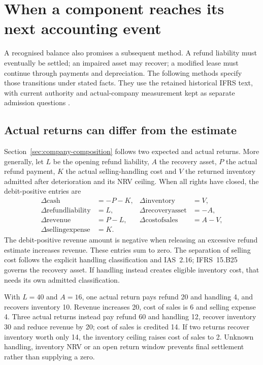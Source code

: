 \section{When a component reaches its next accounting event}
\label{sec:corporate-residuals}

A recognised balance also promises a subsequent method. A refund liability
must eventually be settled; an impaired asset may recover; a modified lease
must continue through payments and depreciation. The following methods specify
those transitions under stated facts. They use the retained historical
IFRS text, with current authority and actual-company measurement kept as
separate admission questions \citep{eu20231803}.

\subsection{Actual returns can differ from the estimate}

Section~\ref{sec:company-composition} follows two expected and actual returns.
More generally, let \(L\) be the opening refund liability, \(A\) the recovery
asset, \(P\) the actual refund payment, \(K\) the actual selling-handling cost
and \(V\) the returned inventory admitted after deterioration and its NRV
ceiling. When all rights have closed, the debit-positive entries are
\begin{align}
 \Delta\mathrm{cash}&=-P-K,&
 \Delta\mathrm{inventory}&=V,\\
 \Delta\mathrm{refund liability}&=L,&
 \Delta\mathrm{recovery asset}&=-A,\\
 \Delta\mathrm{revenue}&=P-L,&
 \Delta\mathrm{cost of sales}&=A-V,\\
 \Delta\mathrm{selling expense}&=K.
\end{align}
The debit-positive revenue amount is negative when releasing an excessive
refund estimate increases revenue. These entries sum to zero. The separation
of selling cost follows the explicit handling classification and IAS~2.16;
IFRS~15.B25 governs the recovery asset. If handling instead creates eligible
inventory cost, that needs its own admitted classification.

With \(L=40\) and \(A=16\), one actual return pays refund 20 and handling 4,
and recovers inventory 10. Revenue increases 20, cost of sales is 6 and selling
expense 4. Three actual returns instead pay refund 60 and handling 12, recover
inventory 30 and reduce revenue by 20; cost of sales is credited 14. If two
returns recover inventory worth only 14, the inventory ceiling raises cost of
sales to 2. Unknown handling, inventory NRV or an open return window prevents
final settlement rather than supplying a zero.

